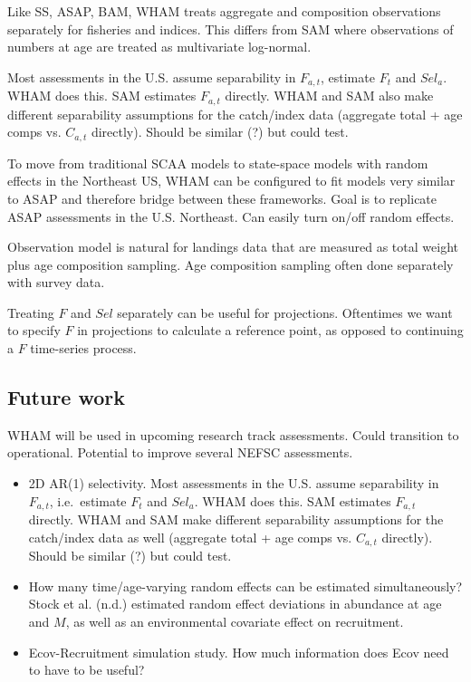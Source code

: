 \documentclass[]{article}
\providecommand{\tightlist}{%
  \setlength{\itemsep}{0pt}\setlength{\parskip}{0pt}}
\begin{document}
Like SS, ASAP, BAM, WHAM treats aggregate and composition observations
separately for fisheries and indices. This differs from SAM where
observations of numbers at age are treated as multivariate log-normal.

Most assessments in the U.S. assume separability in \(F_{a,t}\),
estimate \(F_t\) and \(Sel_a\). WHAM does this. SAM estimates
\(F_{a,t}\) directly. WHAM and SAM also make different separability
assumptions for the catch/index data (aggregate total + age comps vs.
\(C_{a,t}\) directly). Should be similar (?) but could test.

To move from traditional SCAA models to state-space models with random
effects in the Northeast US, WHAM can be configured to fit models very
similar to ASAP and therefore bridge between these frameworks. Goal is
to replicate ASAP assessments in the U.S. Northeast. Can easily turn
on/off random effects.

Observation model is natural for landings data that are measured as
total weight plus age composition sampling. Age composition sampling
often done separately with survey data.

Treating \(F\) and \(Sel\) separately can be useful for projections.
Oftentimes we want to specify \(F\) in projections to calculate a
reference point, as opposed to continuing a \(F\) time-series process.

\hypertarget{future-work}{%
\subsection{Future work}\label{future-work}}

WHAM will be used in upcoming research track assessments. Could
transition to operational. Potential to improve several NEFSC
assessments.

\begin{itemize}
\tightlist
\item
  2D AR(1) selectivity. Most assessments in the U.S. assume separability
  in \(F_{a,t}\), i.e.~estimate \(F_t\) and \(Sel_a\). WHAM does this.
  SAM estimates \(F_{a,t}\) directly. WHAM and SAM make different
  separability assumptions for the catch/index data as well (aggregate
  total + age comps vs. \(C_{a,t}\) directly). Should be similar (?) but
  could test.
\item
  How many time/age-varying random effects can be estimated
  simultaneously? Stock et al. (n.d.) estimated random effect deviations
  in abundance at age and \(M\), as well as an environmental covariate
  effect on recruitment.
\item
  Ecov-Recruitment simulation study. How much information does Ecov need
  to have to be useful?
\end{itemize}
\end{document}
